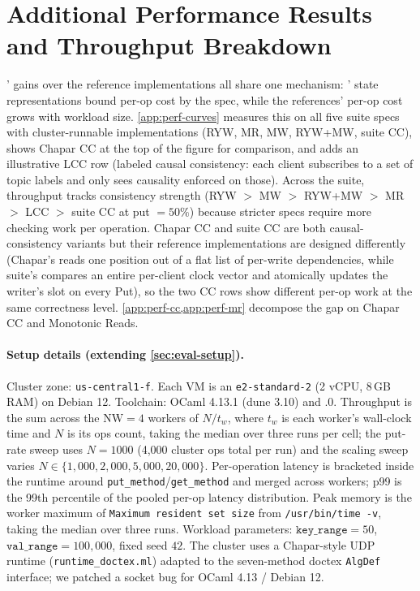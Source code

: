 \section{Additional Performance Results and Throughput Breakdown}
\label{app:perf}
\label{app:perf-harness}

\sys{}' gains over the reference implementations all share one mechanism: \sys{}' state representations bound per-op cost by the spec, while the references' per-op cost grows with workload size. \cref{app:perf-curves} measures this on all five \sys{} suite specs with cluster-runnable implementations (RYW, MR, MW, RYW+MW, \sys{} suite CC), shows Chapar CC at the top of the figure for comparison, and adds an illustrative LCC row (labeled causal consistency: each client subscribes to a set of topic labels and only sees causality enforced on those). Across the \sys{} suite, throughput tracks consistency strength (RYW $>$ MW $>$ RYW+MW $>$ MR $>$ LCC $>$ \sys{} suite CC at put $=50\%$) because stricter specs require more checking work per operation. Chapar CC and \sys{} suite CC are both causal-consistency variants but their reference implementations are designed differently (Chapar's reads one position out of a flat list of per-write dependencies, while \sys{} suite's compares an entire per-client clock vector and atomically updates the writer's slot on every Put), so the two CC rows show different per-op work at the same correctness level. \cref{app:perf-cc,app:perf-mr} decompose the gap on Chapar CC and Monotonic Reads.

\paragraph{Setup details (extending \cref{sec:eval-setup}).}
Cluster zone: \texttt{us-central1-f}. Each VM is an \texttt{e2-standard-2} (2 vCPU, 8\,GB RAM) on Debian 12. Toolchain: OCaml 4.13.1 (dune 3.10) and .0. Throughput is the sum across the $\text{NW}=4$ workers of $N / t_w$, where $t_w$ is each worker's wall-clock time and $N$ is its ops count, taking the median over three runs per cell; the put-rate sweep uses $N=1000$ (4{,}000 cluster ops total per run) and the scaling sweep varies $N \in \{1{,}000, 2{,}000, 5{,}000, 20{,}000\}$. Per-operation latency is bracketed inside the runtime around \texttt{put\_method}/\texttt{get\_method} and merged across workers; p99 is the 99th percentile of the pooled per-op latency distribution. Peak memory is the worker maximum of \texttt{Maximum resident set size} from \texttt{/usr/bin/time -v}, taking the median over three runs. Workload parameters: $\texttt{key\_range}=50$, $\texttt{val\_range}=100{,}000$, fixed seed $42$. The cluster uses a Chapar-style UDP runtime (\texttt{runtime\_doctex.ml}) adapted to the seven-method doctex \texttt{AlgDef} interface; we patched a socket bug for OCaml 4.13 / Debian 12.

